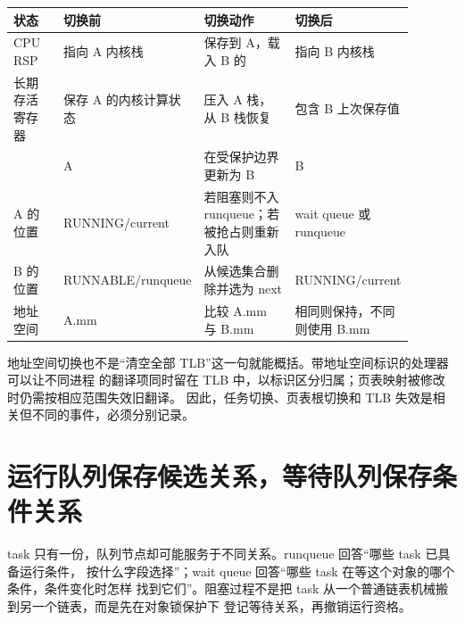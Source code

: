 \begin{longtable}{|L{0.14\linewidth}|L{0.25\linewidth}|L{0.25\linewidth}|L{0.25\linewidth}|}
\hline
状态 & 切换前 & 切换动作 & 切换后 \\ \hline
CPU RSP & 指向 A 内核栈 & 保存到 A，载入 B 的  & 指向 B 内核栈 \\ \hline
长期存活寄存器 & 保存 A 的内核计算状态 & 压入 A 栈，从 B 栈恢复 & 包含 B 上次保存值 \\ \hline
{} & A & 在受保护边界更新为 B & B \\ \hline
A 的位置 & RUNNING/current & 若阻塞则不入 runqueue；若被抢占则重新入队 & wait queue 或 runqueue \\ \hline
B 的位置 & RUNNABLE/runqueue & 从候选集合删除并选为 next & RUNNING/current \\ \hline
地址空间 & A.mm & 比较 A.mm 与 B.mm & 相同则保持，不同则使用 B.mm \\ \hline
\end{longtable}

地址空间切换也不是“清空全部 TLB”这一句就能概括。带地址空间标识的处理器可以让不同进程
的翻译项同时留在 TLB 中，以标识区分归属；页表映射被修改时仍需按相应范围失效旧翻译。
因此，任务切换、页表根切换和 TLB 失效是相关但不同的事件，必须分别记录。

\section{运行队列保存候选关系，等待队列保存条件关系}

task 只有一份，队列节点却可能服务于不同关系。runqueue 回答“哪些 task 已具备运行条件，
按什么字段选择”；wait queue 回答“哪些 task 在等这个对象的哪个条件，条件变化时怎样
找到它们”。阻塞过程不是把 task 从一个普通链表机械搬到另一个链表，而是先在对象锁保护下
登记等待关系，再撤销运行资格。

